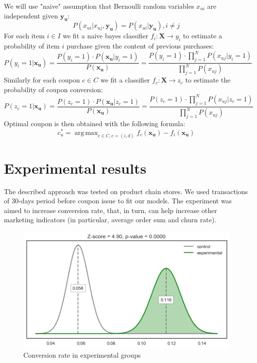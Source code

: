 \documentclass[12pt]{article}
\DeclareMathOperator*{\argmax}{arg\,max}
\begin{document}
We will use "naive" assumption that Bernoulli random variables $x_{ui}$ are independent given $\mathbf{y_u}$:
\begin{equation}
P(x_{ui} | x_{uj}, \mathbf{y_u}) = P(x_{ui} | \mathbf{y_u}), i \ne j
\end{equation}
For each item $i \in I$ we fit a naive bayes classifier $f_i: \mathbf{X} \rightarrow y_i$ to estimate a probability of item $i$ purchase given the content of previous purchases:
\begin{equation}
P(y_i = 1 | \mathbf{x_u}) = \frac{P(y_i = 1) \cdot P(\mathbf{x_u} | y_i = 1)}{P(\mathbf{x_u})} = \frac{P(y_i = 1) \cdot \prod_{j=1}^N P(x_{uj} | y_i = 1)}{\prod_{j=1}^N P(x_{uj})}
\end{equation}
Similarly for each coupon $c \in C$ we fit a classifier $f_c: \mathbf{X} \rightarrow z_c$ to estimate the probability of coupon conversion:
\begin{equation}
P(z_c = 1 | \mathbf{x_u}) = \frac{P(z_c = 1) \cdot P(\mathbf{x_u} | z_c = 1)}{P(\mathbf{x_u})} = \frac{P(z_c = 1) \cdot \prod_{j=1}^N P(x_{uj} | z_c = 1)}{\prod_{j=1}^N P(x_{uj})}
\end{equation}
Optimal coupon is then obtained with the following formula:
\begin{equation}
c_u^* = \argmax_{c \in C, c = (i, d)} f_c(\mathbf{x_u}) - f_i(\mathbf{x_u})
\end{equation}
\par

\section{Experimental results}
The described approach was tested on product chain stores. We used transactions of 30-days period before coupon issue to fit our models. The experiment was aimed to increase conversion rate, that, in turn, can help increase other marketing indicators (in particular, average order sum and churn rate). \par

\begin{figure}
  \includegraphics[width=\linewidth]{b.jpg}
  \caption{Conversion rate in experimental groups}
  \label{fig:exp}
\end{figure}
\end{document}
